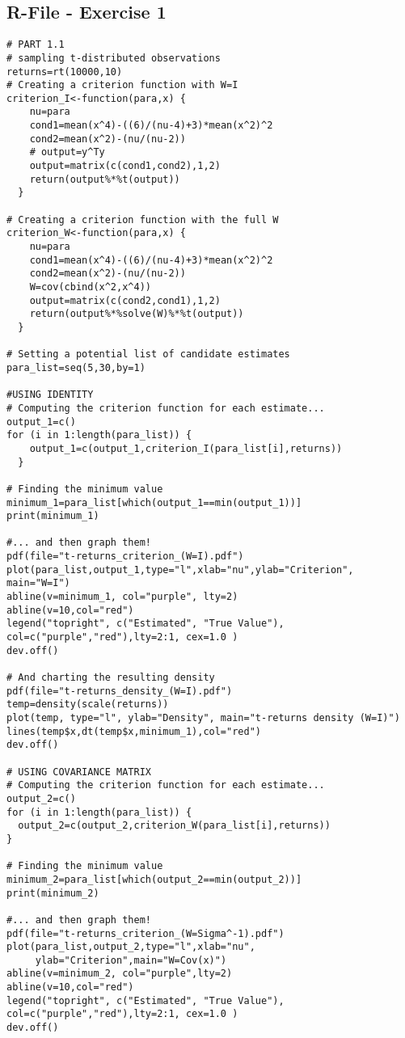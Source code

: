 \begin{appendices}

\chapter{R-File - Exercise 1}

\begin{verbatim}
# PART 1.1
# sampling t-distributed observations
returns=rt(10000,10)
# Creating a criterion function with W=I
criterion_I<-function(para,x) {
    nu=para
    cond1=mean(x^4)-((6)/(nu-4)+3)*mean(x^2)^2
    cond2=mean(x^2)-(nu/(nu-2))
    # output=y^Ty
    output=matrix(c(cond1,cond2),1,2)
    return(output%*%t(output))
  }

# Creating a criterion function with the full W
criterion_W<-function(para,x) {
    nu=para
    cond1=mean(x^4)-((6)/(nu-4)+3)*mean(x^2)^2
    cond2=mean(x^2)-(nu/(nu-2))
    W=cov(cbind(x^2,x^4))
    output=matrix(c(cond2,cond1),1,2)
    return(output%*%solve(W)%*%t(output))
  }

# Setting a potential list of candidate estimates
para_list=seq(5,30,by=1)

#USING IDENTITY
# Computing the criterion function for each estimate...
output_1=c()
for (i in 1:length(para_list)) {
    output_1=c(output_1,criterion_I(para_list[i],returns))
  }

# Finding the minimum value
minimum_1=para_list[which(output_1==min(output_1))]
print(minimum_1)

#... and then graph them!
pdf(file="t-returns_criterion_(W=I).pdf")
plot(para_list,output_1,type="l",xlab="nu",ylab="Criterion",
main="W=I")
abline(v=minimum_1, col="purple", lty=2)
abline(v=10,col="red")
legend("topright", c("Estimated", "True Value"),
col=c("purple","red"),lty=2:1, cex=1.0 )
dev.off()

# And charting the resulting density
pdf(file="t-returns_density_(W=I).pdf")
temp=density(scale(returns))
plot(temp, type="l", ylab="Density", main="t-returns density (W=I)")
lines(temp$x,dt(temp$x,minimum_1),col="red")
dev.off()

# USING COVARIANCE MATRIX
# Computing the criterion function for each estimate...
output_2=c()
for (i in 1:length(para_list)) {
  output_2=c(output_2,criterion_W(para_list[i],returns))
}

# Finding the minimum value
minimum_2=para_list[which(output_2==min(output_2))]
print(minimum_2)

#... and then graph them!
pdf(file="t-returns_criterion_(W=Sigma^-1).pdf")
plot(para_list,output_2,type="l",xlab="nu",
     ylab="Criterion",main="W=Cov(x)")
abline(v=minimum_2, col="purple",lty=2)
abline(v=10,col="red")
legend("topright", c("Estimated", "True Value"),
col=c("purple","red"),lty=2:1, cex=1.0 )
dev.off()


\end{verbatim}
\end{appendices}
